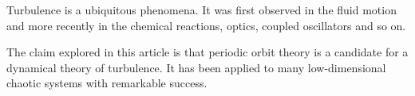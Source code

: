 %

Turbulence is a ubiquitous phenomena. It was first observed in the fluid
motion
and more recently in the chemical reactions, optics, coupled oscillators
and so on.


The claim explored in this
article is that periodic orbit theory is a candidate for a
dynamical theory of turbulence. It has been
applied to many low-dimensional chaotic systems with remarkable success.
